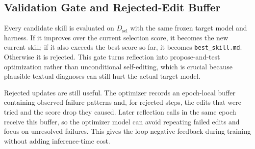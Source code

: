 \subsection{Validation Gate and Rejected-Edit Buffer}
\label{sec:method_gate}

Every candidate skill is evaluated on $D_{\mathrm{sel}}$ with the same frozen target model and harness. If it improves over the current selection score, it becomes the new current skill; if it also exceeds the best score so far, it becomes \texttt{best\_skill.md}. Otherwise it is rejected. This gate turns reflection into propose-and-test optimization rather than unconditional self-editing, which is crucial because plausible textual diagnoses can still hurt the actual target model.

Rejected updates are still useful. The optimizer records an epoch-local buffer containing observed failure patterns and, for rejected steps, the edits that were tried and the score drop they caused. Later reflection calls in the same epoch receive this buffer, so the optimizer model can avoid repeating failed edits and focus on unresolved failures. This gives the loop negative feedback during training without adding inference-time cost.
